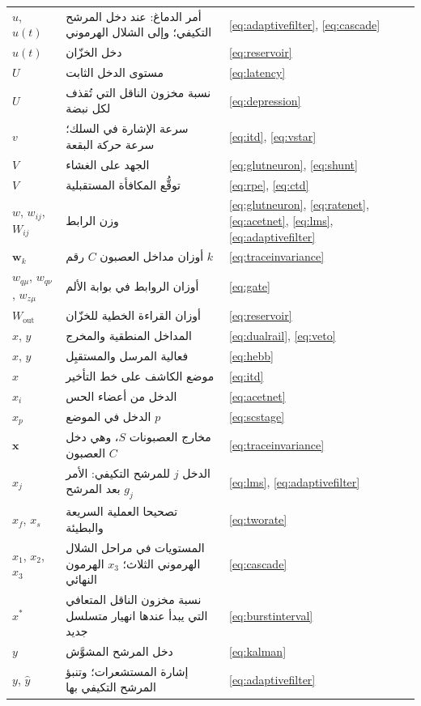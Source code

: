 \begin{center}
\begin{longtable}{>{\raggedright}p{2.0cm}>{\raggedright}p{9.6cm}>{\raggedright\arraybackslash}p{2.4cm}}
$u$, $u(t)$ & أمر الدماغ: عند دخل المرشح التكيفي؛ وإلى الشلال الهرموني & \eqref{eq:adaptivefilter}, \eqref{eq:cascade} \\
$u(t)$ & دخل الخزّان & \eqref{eq:reservoir} \\
$U$ & مستوى الدخل الثابت & \eqref{eq:latency} \\
$U$ & نسبة مخزون الناقل التي تُقذف لكل نبضة & \eqref{eq:depression} \\
$v$ & سرعة الإشارة في السلك؛ سرعة حركة البقعة & \eqref{eq:itd}, \eqref{eq:vstar} \\
$V$ & الجهد على الغشاء & \eqref{eq:glutneuron}, \eqref{eq:shunt} \\
$V$ & توقُّع المكافأة المستقبلية & \eqref{eq:rpe}, \eqref{eq:ctd} \\
$w$, $w_{ij}$, $W_{ij}$ & وزن الرابط & \eqref{eq:glutneuron}, \eqref{eq:ratenet}, \eqref{eq:acetnet}, \eqref{eq:lms}, \eqref{eq:adaptivefilter} \\
$\mathbf w_k$ & أوزان مداخل العصبون $C$ رقم $k$ & \eqref{eq:traceinvariance} \\
$w_{q\mu}$, $w_{q\nu}$, $w_{z\mu}$ & أوزان الروابط في بوابة الألم & \eqref{eq:gate} \\
$W_{\text{out}}$ & أوزان القراءة الخطية للخزّان & \eqref{eq:reservoir} \\
$x$, $y$ & المداخل المنطقية والمخرج & \eqref{eq:dualrail}, \eqref{eq:veto} \\
$x$, $y$ & فعالية المرسل والمستقبِل & \eqref{eq:hebb} \\
$x$ & موضع الكاشف على خط التأخير & \eqref{eq:itd} \\
$x_i$ & الدخل من أعضاء الحس & \eqref{eq:acetnet} \\
$x_p$ & الدخل في الموضع $p$ & \eqref{eq:scstage} \\
$\mathbf x$ & مخارج العصبونات $S$، وهي دخل العصبون $C$ & \eqref{eq:traceinvariance} \\
$x_j$ & الدخل $j$ للمرشح التكيفي: الأمر بعد المرشح $g_j$ & \eqref{eq:lms}, \eqref{eq:adaptivefilter} \\
$x_f$, $x_s$ & تصحيحا العملية السريعة والبطيئة & \eqref{eq:tworate} \\
$x_1$, $x_2$, $x_3$ & المستويات في مراحل الشلال الهرموني الثلاث؛ $x_3$ الهرمون النهائي & \eqref{eq:cascade} \\
$x^*$ & نسبة مخزون الناقل المتعافي التي يبدأ عندها انهيار متسلسل جديد & \eqref{eq:burstinterval} \\
$y$ & دخل المرشح المشوَّش & \eqref{eq:kalman} \\
$y$, $\hat y$ & إشارة المستشعرات؛ وتنبؤ المرشح التكيفي بها & \eqref{eq:adaptivefilter} \\

\end{longtable}
\end{center}
